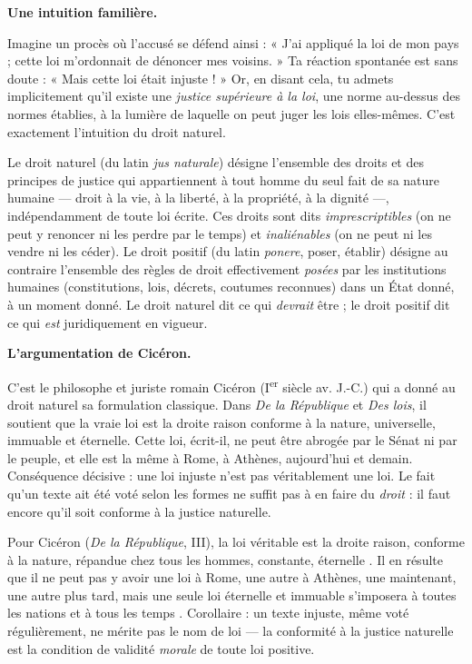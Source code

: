 \documentclass[11pt]{article}
\newcommand{\cle}[1]{{\popxbold\color{popdark}#1}}
\newcounter{popsec}
\newcounter{popsub}
\newcommand{\courssub}[1]{%
  \stepcounter{popsub}%
  \par\vspace{9pt}\noindent{\popxbold\fontsize{11.5}{13}\selectfont\color{popink}{\color{poporange}\thepopsec.\thepopsub}\hspace{6pt}#1}\par\nopagebreak\vspace{4pt}
}
\begin{document}
\courssub{Le droit naturel : des droits antérieurs à toute loi}

\textbf{Une intuition familière.}\par

Imagine un procès où l'accusé se défend ainsi : « J'ai appliqué la loi de mon pays ; cette loi m'ordonnait de dénoncer mes voisins. » Ta réaction spontanée est sans doute : « Mais cette loi était injuste ! » Or, en disant cela, tu admets implicitement qu'il existe une \emph{justice supérieure à la loi}, une norme au-dessus des normes établies, à la lumière de laquelle on peut juger les lois elles-mêmes. C'est exactement l'intuition du droit naturel.

\begin{definition}
Le \cle{droit naturel} (du latin \emph{jus naturale}) désigne l'ensemble des droits et des principes de justice qui appartiennent à tout homme du seul fait de sa nature humaine — droit à la vie, à la liberté, à la propriété, à la dignité —, indépendamment de toute loi écrite. Ces droits sont dits \emph{imprescriptibles} (on ne peut y renoncer ni les perdre par le temps) et \emph{inaliénables} (on ne peut ni les vendre ni les céder). Le \cle{droit positif} (du latin \emph{ponere}, poser, établir) désigne au contraire l'ensemble des règles de droit effectivement \emph{posées} par les institutions humaines (constitutions, lois, décrets, coutumes reconnues) dans un État donné, à un moment donné. Le droit naturel dit ce qui \emph{devrait} être ; le droit positif dit ce qui \emph{est} juridiquement en vigueur.
\end{definition}

\textbf{L'argumentation de Cicéron.}\par

C'est le philosophe et juriste romain Cicéron (I\textsuperscript{er} siècle av. J.-C.) qui a donné au droit naturel sa formulation classique. Dans \emph{De la République} et \emph{Des lois}, il soutient que la vraie loi est la droite raison conforme à la nature, universelle, immuable et éternelle. Cette loi, écrit-il, ne peut être abrogée par le Sénat ni par le peuple, et elle est la même à Rome, à Athènes, aujourd'hui et demain. Conséquence décisive : une loi injuste n'est pas véritablement une loi. Le fait qu'un texte ait été voté selon les formes ne suffit pas à en faire du \emph{droit} : il faut encore qu'il soit conforme à la justice naturelle.

\begin{propriete}
Pour Cicéron (\emph{De la République}, III), la loi véritable est \guillemotleft la droite raison, conforme à la nature, répandue chez tous les hommes, constante, éternelle \guillemotright. Il en résulte que \guillemotleft il ne peut pas y avoir une loi à Rome, une autre à Athènes, une maintenant, une autre plus tard, mais une seule loi éternelle et immuable s'imposera à toutes les nations et à tous les temps \guillemotright. Corollaire : un texte injuste, même voté régulièrement, ne mérite pas le nom de loi — la conformité à la justice naturelle est la condition de validité \emph{morale} de toute loi positive.
\end{propriete}
\end{document}
